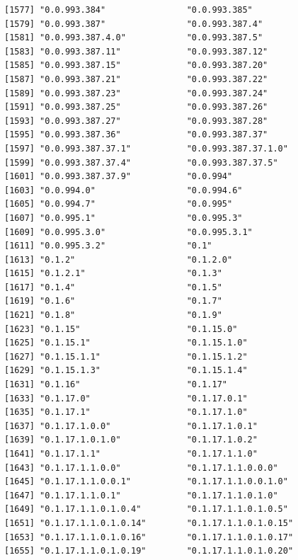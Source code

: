 \documentclass[
  letterpaper,
  DIV=11,
  numbers=noendperiod]{scrreprt}
\begin{document}
\begin{verbatim}
[1577] "0.0.993.384"                "0.0.993.385"               
[1579] "0.0.993.387"                "0.0.993.387.4"             
[1581] "0.0.993.387.4.0"            "0.0.993.387.5"             
[1583] "0.0.993.387.11"             "0.0.993.387.12"            
[1585] "0.0.993.387.15"             "0.0.993.387.20"            
[1587] "0.0.993.387.21"             "0.0.993.387.22"            
[1589] "0.0.993.387.23"             "0.0.993.387.24"            
[1591] "0.0.993.387.25"             "0.0.993.387.26"            
[1593] "0.0.993.387.27"             "0.0.993.387.28"            
[1595] "0.0.993.387.36"             "0.0.993.387.37"            
[1597] "0.0.993.387.37.1"           "0.0.993.387.37.1.0"        
[1599] "0.0.993.387.37.4"           "0.0.993.387.37.5"          
[1601] "0.0.993.387.37.9"           "0.0.994"                   
[1603] "0.0.994.0"                  "0.0.994.6"                 
[1605] "0.0.994.7"                  "0.0.995"                   
[1607] "0.0.995.1"                  "0.0.995.3"                 
[1609] "0.0.995.3.0"                "0.0.995.3.1"               
[1611] "0.0.995.3.2"                "0.1"                       
[1613] "0.1.2"                      "0.1.2.0"                   
[1615] "0.1.2.1"                    "0.1.3"                     
[1617] "0.1.4"                      "0.1.5"                     
[1619] "0.1.6"                      "0.1.7"                     
[1621] "0.1.8"                      "0.1.9"                     
[1623] "0.1.15"                     "0.1.15.0"                  
[1625] "0.1.15.1"                   "0.1.15.1.0"                
[1627] "0.1.15.1.1"                 "0.1.15.1.2"                
[1629] "0.1.15.1.3"                 "0.1.15.1.4"                
[1631] "0.1.16"                     "0.1.17"                    
[1633] "0.1.17.0"                   "0.1.17.0.1"                
[1635] "0.1.17.1"                   "0.1.17.1.0"                
[1637] "0.1.17.1.0.0"               "0.1.17.1.0.1"              
[1639] "0.1.17.1.0.1.0"             "0.1.17.1.0.2"              
[1641] "0.1.17.1.1"                 "0.1.17.1.1.0"              
[1643] "0.1.17.1.1.0.0"             "0.1.17.1.1.0.0.0"          
[1645] "0.1.17.1.1.0.0.1"           "0.1.17.1.1.0.0.1.0"        
[1647] "0.1.17.1.1.0.1"             "0.1.17.1.1.0.1.0"          
[1649] "0.1.17.1.1.0.1.0.4"         "0.1.17.1.1.0.1.0.5"        
[1651] "0.1.17.1.1.0.1.0.14"        "0.1.17.1.1.0.1.0.15"       
[1653] "0.1.17.1.1.0.1.0.16"        "0.1.17.1.1.0.1.0.17"       
[1655] "0.1.17.1.1.0.1.0.19"        "0.1.17.1.1.0.1.0.20"       

\end{verbatim}
\end{document}
